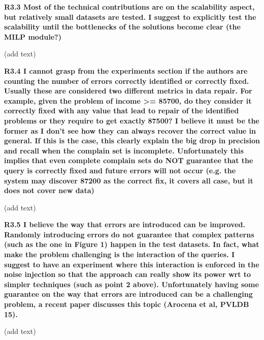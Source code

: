 \documentclass{vldb}
\newcounter{prob}
\begin{document}
\noindent \textbf{R3.3 Most of the technical contributions are on the scalability aspect, but relatively small datasets are tested. I suggest to explicitly test the scalability until the bottlenecks of the solutions become clear (the MILP module?)}

(add text)

\noindent \textbf{R3.4 I cannot grasp from the experiments section if the authors are counting the number of errors correctly identified or correctly fixed. Usually these are considered two different metrics in data repair. For example, given the problem of income >= 85700, do they consider it correctly fixed with any value that lead to repair of the identified problems or they require to get exactly 87500? 
I believe it must be the former as I don’t see how they can always recover the correct value in general. If this is the case, this clearly explain the big drop in precision and recall when the complain set is incomplete. Unfortunately this implies that even complete complain sets do NOT guarantee that the query is correctly fixed and future errors will not occur (e.g. the system may discover 87200 as the correct fix, it covers all case, but it does not cover new data)}

(add text)

\noindent \textbf{R3.5 I believe the way that errors are introduced can be improved. Randomly introducing errors do not guarantee that complex patterns (such as the one in Figure 1) happen in the test datasets. In fact, what make the problem challenging is the interaction of the queries. I suggest to have an experiment where this interaction is enforced in the noise injection so that the approach can really show its power wrt to simpler techniques (such as point 2 above). 
Unfortunately having some guarantee on the way that errors are introduced can be a challenging problem, a recent paper discusses this topic (Arocena et al, PVLDB 15).}

(add text)
\end{document}
